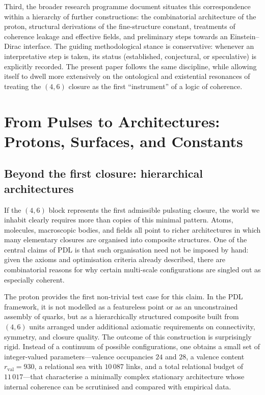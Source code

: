 \documentclass[11pt,a4paper]{article}
\theoremstyle{definition}
\begin{document}
Third, the broader research programme document situates this correspondence within a hierarchy of further constructions: the combinatorial architecture of the proton, structural derivations of the fine-structure constant, treatments of coherence leakage and effective fields, and preliminary steps towards an Einstein--Dirac interface.\cite{Laubscher_PDL_Position_2024,Laubscher_ProtonArch_v2_2024,Laubscher_Alpha_v2_2024,Laubscher_EffectiveFields_2024,Laubscher_Einstein_Dirac_2024} The guiding methodological stance is conservative: whenever an interpretative step is taken, its status (established, conjectural, or speculative) is explicitly recorded. The present paper follows the same discipline, while allowing itself to dwell more extensively on the ontological and existential resonances of treating the \((4,6)\) closure as the first ``instrument'' of a logic of coherence.

\section{From Pulses to Architectures: Protons, Surfaces, and Constants}
\label{sec:architectures}

\subsection{Beyond the first closure: hierarchical architectures}

If the \((4,6)\) block represents the first admissible pulsating closure, the world we inhabit clearly requires more than copies of this minimal pattern. Atoms, molecules, macroscopic bodies, and fields all point to richer architectures in which many elementary closures are organised into composite structures. One of the central claims of PDL is that such organisation need not be imposed by hand: given the axioms and optimisation criteria already described, there are combinatorial reasons for why certain multi-scale configurations are singled out as especially coherent.\cite{Laubscher_EmergencePhysicalReality_2024,Laubscher_PDL_GlobalMapping_v6_2024}

The proton provides the first non-trivial test case for this claim. In the PDL framework, it is not modelled as a featureless point or as an unconstrained assembly of quarks, but as a hierarchically structured composite built from \((4,6)\) units arranged under additional axiomatic requirements on connectivity, symmetry, and closure quality.\cite{Laubscher_ProtonArch_v1_2024,Laubscher_ProtonArch_v2_2024} The outcome of this construction is surprisingly rigid. Instead of a continuum of possible configurations, one obtains a small set of integer-valued parameters---valence occupancies \(24\) and \(28\), a valence content \(r_{\mathrm{val}} = 930\), a relational sea with \(10\,087\) links, and a total relational budget of \(11\,017\)---that characterise a minimally complex stationary architecture whose internal coherence can be scrutinised and compared with empirical data.\cite{Laubscher_ProtonArch_v2_2024,Laubscher_PDL_GlobalMapping_v6_2024}
\end{document}

